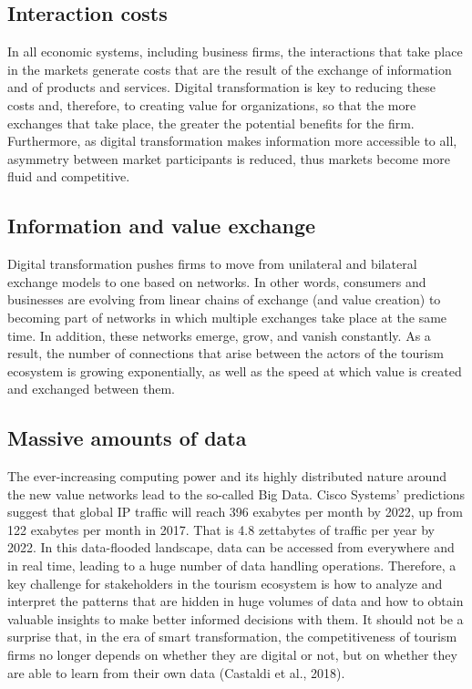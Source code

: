 \documentclass[
  letterpaper,
  DIV=11,
  numbers=noendperiod]{scrreprt}
\begin{document}
\hypertarget{interaction-costs}{%
\subsection{Interaction costs}\label{interaction-costs}}

In all economic systems, including business firms, the interactions that
take place in the markets generate costs that are the result of the
exchange of information and of products and services. Digital
transformation is key to reducing these costs and, therefore, to
creating value for organizations, so that the more exchanges that take
place, the greater the potential benefits for the firm. Furthermore, as
digital transformation makes information more accessible to all,
asymmetry between market participants is reduced, thus markets become
more fluid and competitive.

\hypertarget{information-and-value-exchange}{%
\subsection{Information and value
exchange}\label{information-and-value-exchange}}

Digital transformation pushes firms to move from unilateral and
bilateral exchange models to one based on networks. In other words,
consumers and businesses are evolving from linear chains of exchange
(and value creation) to becoming part of networks in which multiple
exchanges take place at the same time. In addition, these networks
emerge, grow, and vanish constantly. As a result, the number of
connections that arise between the actors of the tourism ecosystem is
growing exponentially, as well as the speed at which value is created
and exchanged between them.

\hypertarget{massive-amounts-of-data}{%
\subsection{Massive amounts of data}\label{massive-amounts-of-data}}

The ever-increasing computing power and its highly distributed nature
around the new value networks lead to the so-called Big Data. Cisco
Systems' predictions suggest that global IP traffic will reach 396
exabytes per month by 2022, up from 122 exabytes per month in 2017. That
is 4.8 zettabytes of traffic per year by 2022. In this data-flooded
landscape, data can be accessed from everywhere and in real time,
leading to a huge number of data handling operations. Therefore, a key
challenge for stakeholders in the tourism ecosystem is how to analyze
and interpret the patterns that are hidden in huge volumes of data and
how to obtain valuable insights to make better informed decisions with
them. It should not be a surprise that, in the era of smart
transformation, the competitiveness of tourism firms no longer depends
on whether they are digital or not, but on whether they are able to
learn from their own data (Castaldi et al., 2018).
\end{document}
